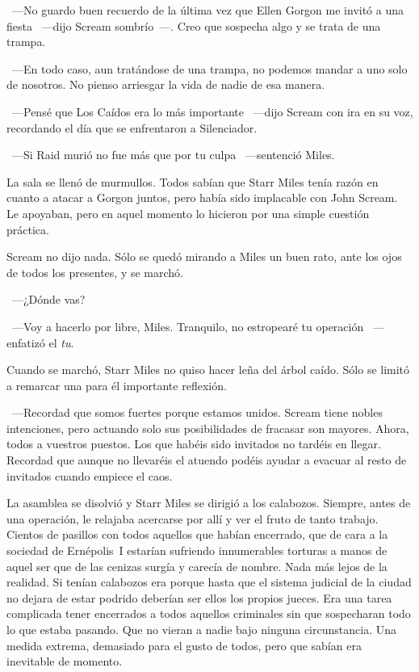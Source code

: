 ~---No guardo buen recuerdo de la última vez que Ellen Gorgon me invitó a una fiesta ~---dijo Scream sombrío~---. Creo que sospecha algo y se trata de una trampa.

~---En todo caso, aun tratándose de una trampa, no podemos mandar a uno solo de nosotros. No pienso arriesgar la vida de nadie de esa manera.

~---Pensé que Los Caídos era lo más importante ~---dijo Scream con ira en su voz, recordando el día que se enfrentaron a Silenciador.

~---Si Raid murió no fue más que por tu culpa ~---sentenció Miles.

La sala se llenó de murmullos. Todos sabían que Starr Miles tenía razón en cuanto a atacar a Gorgon juntos, pero había sido implacable con John Scream. Le apoyaban, pero en aquel momento lo hicieron por una simple cuestión práctica.

Scream no dijo nada. Sólo se quedó mirando a Miles un buen rato, ante los ojos de todos los presentes, y se marchó.

~---¿Dónde vas?

~---Voy a hacerlo por libre, Miles. Tranquilo, no estropearé tu operación ~---enfatizó el \emph{tu}.

Cuando se marchó, Starr Miles no quiso hacer leña del árbol caído. Sólo se limitó a remarcar una para él importante reflexión.

~---Recordad que somos fuertes porque estamos unidos. Scream tiene nobles intenciones, pero actuando solo sus posibilidades de fracasar son mayores. Ahora, todos a vuestros puestos. Los que habéis sido invitados no tardéis en llegar. Recordad que aunque no llevaréis el atuendo podéis ayudar a evacuar al resto de invitados cuando empiece el caos.

La asamblea se disolvió y Starr Miles se dirigió a los calabozos. Siempre, antes de una operación, le relajaba acercarse por allí y ver el fruto de tanto trabajo. Cientos de pasillos con todos aquellos que habían encerrado, que de cara a la sociedad de Ernépolis~I estarían sufriendo innumerables torturas a manos de aquel ser que de las cenizas surgía y carecía de nombre. Nada más lejos de la realidad. Si tenían calabozos era porque hasta que el sistema judicial de la ciudad no dejara de estar podrido deberían ser ellos los propios jueces. Era una tarea complicada tener encerrados a todos aquellos criminales sin que sospecharan todo lo que estaba pasando. Que no vieran a nadie bajo ninguna circunstancia. Una medida extrema, demasiado para el gusto de todos, pero que sabían era inevitable de momento.

